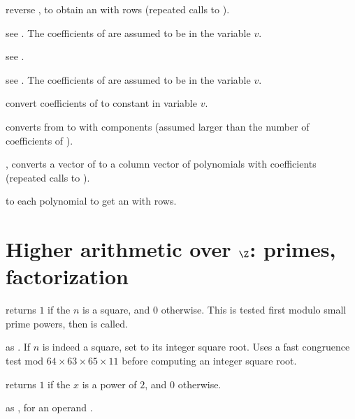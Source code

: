  reverse , to obtain
an  with  rows (repeated calls to ).

 see .
The coefficients of  are assumed to be in the variable $v$.

 see .

 see .
The coefficients of  are assumed to be in the variable $v$.

 convert coefficients of  to
constant  in variable $v$.


 converts from  to 
with  components (assumed larger than the number of coefficients of
).

, converts a vector of  to a column
vector of polynomials with  coefficients (repeated calls to
).



  to each polynomial
to get an  with  rows.

\section{Higher arithmetic over $\Z$: primes, factorization}


 returns $1$ if the  $n$ is
a square, and $0$ otherwise. This is tested first modulo small prime
powers, then  is called.

 as . If
$n$ is indeed a square, set  to its integer square root.
Uses a fast congruence test mod $64\times 63\times 65\times 11$ before
computing an integer square root.

 returns $1$ if the  $x$ is a power of
$2$, and $0$ otherwise.

 as ,
for an  operand .

